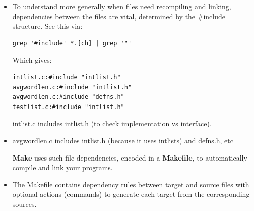 \documentclass[handout]{beamer}
\begin{document}
\begin{frame}[fragile]

    \begin{itemize}
    \item
    To understand more generally when files need recompiling and linking,
    \alert{dependencies} between the files are vital,
    determined by the \alert{\#include} structure.
    \pause
    See this via:
\begin{verbatim}
grep '#include' *.[ch] | grep '"'
\end{verbatim}

    \pitem
    Which gives:
{\small
\begin{verbatim}
intlist.c:#include "intlist.h"
avgwordlen.c:#include "intlist.h"
avgwordlen.c:#include "defns.h"
testlist.c:#include "intlist.h"
\end{verbatim}
}

    \pitem \alert{intlist.c} includes \alert{intlist.h}
            (to check implementation vs interface).
    \item \alert{avgwordlen.c} includes \alert{intlist.h} (because it uses intlists) and \alert{defns.h}, etc

    \pitem
    {\bf Make} uses such file dependencies,
    encoded in a {\bf Makefile},
    to automatically compile and link your programs.

    \item
    The Makefile contains dependency rules between
    \alert{target} and \alert{source} files with
    \alert{optional actions} (commands) to generate each
    target from the corresponding sources.
    \end{itemize}

\end{frame}
\end{document}
